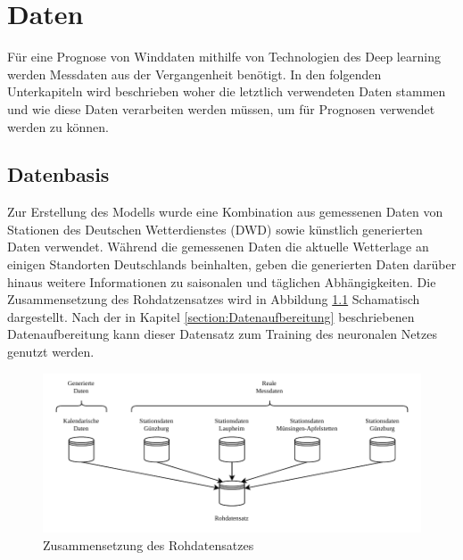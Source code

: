 \documentclass[
12pt, %
toc=listofnumbered, %
toc=chapterentrydotfill, %
numbers=noenddot, %
captions=tableheading, %
bibliography=numbered
]{scrreprt}
\let\Oldsection\section
\renewcommand{\section}{\FloatBarrier\Oldsection}
\begin{document}
\chapter{Daten}

Für eine Prognose von Winddaten mithilfe von Technologien des Deep learning werden Messdaten aus der Vergangenheit benötigt. 
In den folgenden Unterkapiteln wird beschrieben woher die letztlich verwendeten Daten stammen und wie diese Daten verarbeiten werden müssen, um für Prognosen verwendet werden zu können.

\section{Datenbasis}\label{section:datenbasis}
Zur Erstellung des Modells wurde eine Kombination aus gemessenen Daten von Stationen des Deutschen Wetterdienstes (DWD) sowie künstlich generierten Daten verwendet.
Während die gemessenen Daten die aktuelle Wetterlage an einigen Standorten Deutschlands beinhalten, geben die generierten Daten darüber hinaus weitere Informationen zu saisonalen und täglichen Abhängigkeiten. Die Zusammensetzung des Rohdatzensatzes wird in Abbildung \ref{fig:rohdatensatz} Schamatisch dargestellt. Nach der in Kapitel \ref{section:Datenaufbereitung} beschriebenen Datenaufbereitung kann dieser Datensatz zum Training des neuronalen Netzes genutzt werden.

\begin{figure}[tph]
	\begin{center}
		\includegraphics[]{./images/rohdatensatz.pdf}
		\caption{Zusammensetzung des Rohdatensatzes}
		\label{fig:rohdatensatz}
	\end{center}
\end{figure}
\end{document}
